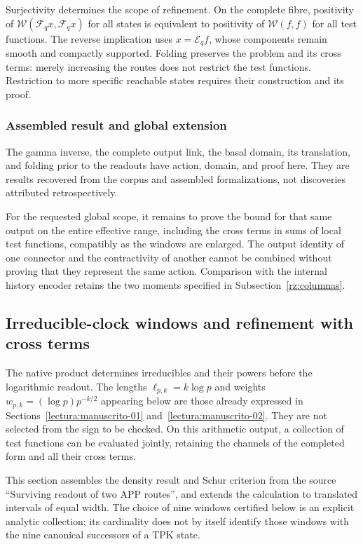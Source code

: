 Surjectivity determines the scope of refinement. On the complete fibre, positivity of \(\mathscr W(\mathcal F_qx,\mathcal F_qx)\) for all states is equivalent to positivity of \(\mathscr W(f,f)\) for all test functions. The reverse implication uses \(x=\mathcal E_qf\), whose components remain smooth and compactly supported. Folding preserves the problem and its cross terms: merely increasing the routes does not restrict the test functions. Restriction to more specific reachable states requires their construction and its proof.

\subsubsection*{Assembled result and global extension}
The gamma inverse, the complete output link, the basal domain, its translation, and folding prior to the readouts have action, domain, and proof here. They are results recovered from the corpus and assembled formalizations, not discoveries attributed retrospectively.

For the requested global scope, it remains to prove the bound for that same output on the entire effective range, including the cross terms in sums of local test functions, compatibly as the windows are enlarged. The output identity of one connector and the contractivity of another cannot be combined without proving that they represent the same action. Comparison with the internal history encoder retains the two moments specified in Subsection~\ref{rz:columnas}.

\subsection{Irreducible-clock windows and refinement with cross terms}
\label{rz:ventanas}
The native product determines irreducibles and their powers before the logarithmic readout. The lengths \(\ell_{p,k}=k\log p\) and weights \(w_{p,k}=(\log p)p^{-k/2}\) appearing below are those already expressed in Sections~\ref{lectura:manuscrito-01} and~\ref{lectura:manuscrito-02}. They are not selected from the sign to be checked. On this arithmetic output, a collection of test functions can be evaluated jointly, retaining the channels of the completed form and all their cross terms.

This section assembles the density result and Schur criterion from the source “Surviving readout of two APP routes”, and extends the calculation to translated intervals of equal width. The choice of nine windows certified below is an explicit analytic collection; its cardinality does not by itself identify those windows with the nine canonical successors of a TPK state.

